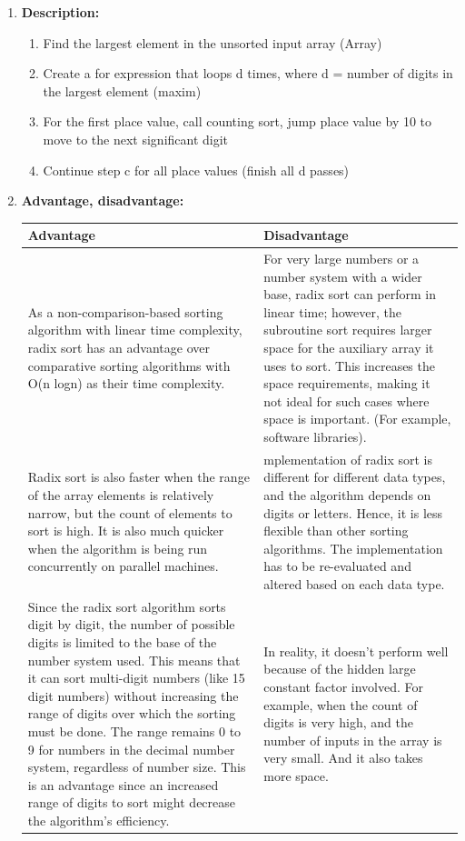 \documentclass[11pt,a4paper]{article}
\begin{document}
{\begin{enumerate}[label=\textbf{\arabic*})]
				\item \textbf{Description:}
					\begin{enumerate}
					\item Find the largest element in the unsorted input array (Array)
					\item Create a for expression that loops d times, where d = number of digits in the largest element (maxim)
					\item For the first place value, call counting sort, jump place value by 10 to move to the next significant digit
					\item Continue step c for all place values (finish all d passes)
					\end{enumerate}
				
				\item \textbf{Advantage, disadvantage:}
					\begin{table}[H]
						\centering
						\begin{tabular}{|p{8cm}|p{8cm}|}
							\hline
							\textbf{Advantage} & \textbf{Disadvantage} \\
							\hline
							\hline
							As a non-comparison-based sorting algorithm with linear time complexity, radix sort has an advantage over comparative sorting algorithms with O(n logn) as their time complexity.   & For very large numbers or a number system with a wider base, radix sort can perform in linear time; however, the subroutine sort requires larger space for the auxiliary array it uses to sort. This increases the space requirements, making it not ideal for such cases where space is important. (For example, software libraries). \\[12pt]
							Radix sort is also faster when the range of the array elements is relatively narrow, but the count of elements to sort is high. It is also much quicker when the algorithm is being run concurrently on parallel machines. & mplementation of radix sort is different for different data types, and the algorithm depends on digits or letters. Hence, it is less flexible than other sorting algorithms. The implementation has to be re-evaluated and altered based on each data type. \\[12pt]
							Since the radix sort algorithm sorts digit by digit, the number of possible digits is limited to the base of the number system used. This means that it can sort multi-digit numbers (like 15 digit numbers) without increasing the range of digits over which the sorting must be done. The range remains 0 to 9 for numbers in the decimal number system, regardless of number size. This is an advantage since an increased range of digits to sort might decrease the algorithm’s efficiency. & In reality, it doesn't perform well because of the hidden large constant factor involved. For example, when the count of digits is very high, and the number of inputs in the array is very small. And it also takes more space. \\

\end{tabular}
\end{table}
\end{enumerate}}
\end{document}
